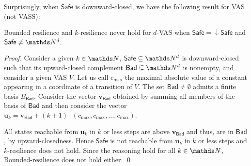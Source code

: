 \documentclass[runningheads]{llncs}
\newcommand{\Bad}{\textsf{Bad}}
\newcommand{\Safe}{\textsf{Safe}}
\begin{document}
Surprisingly, when $\Safe$ is downward-closed, we have the following result for VAS (not VASS):
\begin{proposition}
{\sc Bounded resilience} and {\sc $k$-resilience} never hold for $d$-VAS when $\Safe = \mathop{\downarrow} \Safe$ and $\Safe \neq \N^d$.
\end{proposition}


\begin{proof}
Consider a given $k \in \N$, $\Safe \subseteq \N^d$ is downward-closed
 such that its upward-closed complement $\Bad \subseteq \N^d$ is nonempty, and
consider a given VAS $V$. 
Let us call $c_{\max}$ the maximal absolute value of a constant appearing in a coordinate of a transition of $V$.
The set $\Bad \neq \emptyset$ admits a finite basis $B_\Bad$.
Consider the vector $\textbf{v}_{\Bad}$ obtained by summing all members of the basis of $\Bad$ and then consider the vector
$\textbf{u}_k = \textbf{v}_{\Bad} + (k+1) \cdot (c_{\max}, c_{\max}, \ldots, c_{\max})$.

All states reachable from $\textbf{u}_k$ in $k$ or less steps are above $ \textbf{v}_{\Bad} $
and thus, are in $\Bad$, by upward-closedness.
Hence  $\Safe$ is not reachable from $\textbf{u}_k$ in $k$ or less steps  and {$k$-resilience} does not hold.
Since the reasoning hold for all $k \in \N$, {\sc Bounded-resilience} does not hold either.
\qed
\end{proof}
\end{document}
